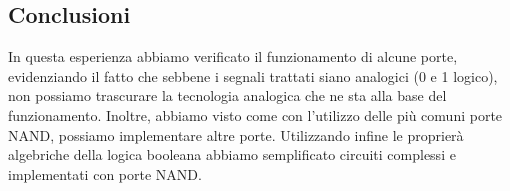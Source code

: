 \subsection{Conclusioni}
In questa esperienza abbiamo verificato il funzionamento di alcune porte, evidenziando il fatto che sebbene i segnali trattati siano analogici (0 e 1 logico), non possiamo trascurare la tecnologia analogica che ne sta alla base del funzionamento. Inoltre, abbiamo visto come con l'utilizzo delle più comuni porte NAND, possiamo implementare altre porte. Utilizzando infine le proprierà algebriche della logica booleana abbiamo semplificato circuiti complessi e implementati con porte NAND.
